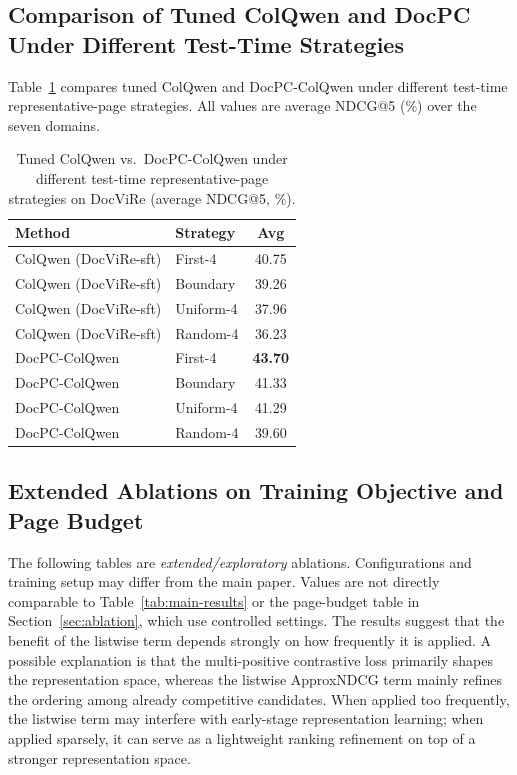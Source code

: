 \subsection{Comparison of Tuned ColQwen and DocPC Under Different Test-Time Strategies}
\label{sec:app-a2b}

Table~\ref{tab:app-a3b} compares tuned ColQwen and DocPC-ColQwen under different test-time representative-page strategies. All values are average NDCG@5 (\%) over the seven domains.

\begin{table}[t]
  \centering
  \footnotesize
  \setlength{\tabcolsep}{4pt}
  \caption{Tuned ColQwen vs.\ DocPC-ColQwen under different test-time representative-page strategies on DocViRe (average NDCG@5, \%).}
  \label{tab:app-a3b}
  \begin{tabular}{@{}llc@{}}
    \toprule
    Method & Strategy & Avg \\
    \midrule
    ColQwen (DocViRe-sft) & First-4   & 40.75 \\
    ColQwen (DocViRe-sft) & Boundary  & 39.26 \\
    ColQwen (DocViRe-sft) & Uniform-4 & 37.96 \\
    ColQwen (DocViRe-sft) & Random-4  & 36.23 \\
    \midrule
    DocPC-ColQwen         & First-4   & \textbf{43.70} \\
    DocPC-ColQwen         & Boundary  & 41.33 \\
    DocPC-ColQwen         & Uniform-4 & 41.29 \\
    DocPC-ColQwen         & Random-4  & 39.60 \\
    \bottomrule
  \end{tabular}
\end{table}

\subsection{Extended Ablations on Training Objective and Page Budget}
\label{sec:app-a4}

The following tables are \emph{extended/exploratory} ablations. Configurations and training setup may differ from the main paper. Values are not directly comparable to Table~\ref{tab:main-results} or the page-budget table in Section~\ref{sec:ablation}, which use controlled settings. The results suggest that the benefit of the listwise term depends strongly on how frequently it is applied. A possible explanation is that the multi-positive contrastive loss primarily shapes the representation space, whereas the listwise ApproxNDCG term mainly refines the ordering among already competitive candidates. When applied too frequently, the listwise term may interfere with early-stage representation learning; when applied sparsely, it can serve as a lightweight ranking refinement on top of a stronger representation space.

